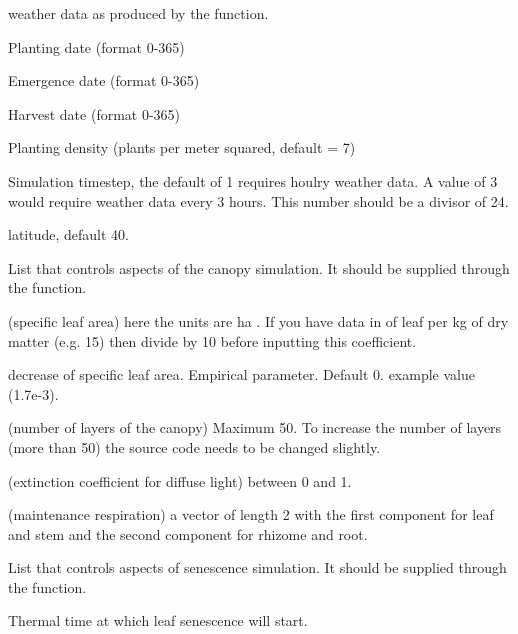 \documentclass[letterpaper]{book}
\begin{document}
\begin{Arguments}
\begin{ldescription}
\item[\code{WetDat}] weather data as produced by the
 function.

\item[\code{plant.day}] Planting date (format 0-365)

\item[\code{emerge.day}] Emergence date (format 0-365)

\item[\code{harvest.day}] Harvest date (format 0-365)

\item[\code{plant.density}] Planting density (plants per meter
squared, default = 7)

\item[\code{timestep}] Simulation timestep, the default of 1
requires houlry weather data. A value of 3 would require
weather data every 3 hours.  This number should be a
divisor of 24.

\item[\code{lat}] latitude, default 40.

\item[\code{canopyControl}] List that controls aspects of the
canopy simulation. It should be supplied through the
 function.

 (specific leaf area) here the units are ha
.  If you have data in  of leaf per
kg of dry matter (e.g. 15) then divide by 10 before
inputting this coefficient.

 decrease of specific leaf area. Empirical
parameter. Default 0. example value (1.7e-3).

 (number of layers of the canopy) Maximum
50. To increase the number of layers (more than 50) the
 source code needs to be changed slightly.

 (extinction coefficient for diffuse light)
between 0 and 1.

 (maintenance respiration) a vector of length
2 with the first component for leaf and stem and the
second component for rhizome and root.

\item[\code{MaizeSeneControl}] List that controls aspects of
senescence simulation. It should be supplied through the
 function.

 Thermal time at which leaf senescence will
start.


\end{ldescription}
\end{Arguments}
\end{document}
